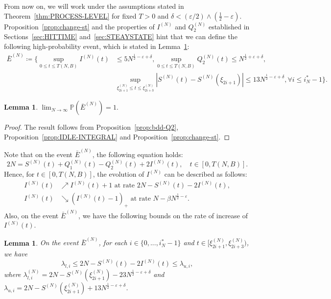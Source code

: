 \documentclass[11pt, reqno]{article}
\newtheorem{lemma}[theorem]{Lemma}
\numberwithin{equation}{section}
\numberwithin{theorem}{section}
\begin{document}
From now on, we will work under the assumptions stated in Theorem~\ref{thm:PROCESS-LEVEL} for fixed $T>0$ and $\delta<(\varepsilon/2) \wedge \left(\frac{1}{2} - \varepsilon\right)$. 
Proposition~\ref{prop:change-st} and the properties of $I^{(N)}$ and $Q_2^{(N)}$ established in Sections~\ref{sec:HITTIME} and~\ref{sec:STEAYSTATE} hint that we can define the following high-probability event, which is stated in Lemma~\ref{lem:EN-to-1}:
\begin{equation}
\begin{split}
    \bar{E}^{(N)}\coloneqq\Big\{\sup_{0\leq t\leq T(N,B)}I^{(N)}(t)&\leq 5N^{\frac{1}{2}-\varepsilon+\delta},\sup_{0\leq t\leq T(N,B)}Q^{(N)}_2(t)\leq  N^{\frac{1}{2}+\varepsilon+\delta},\\
    &\sup_{\xi^{(N)}_{2i+1}\leq t\leq \xi^{(N)}_{2i+3}}\left|S^{(N)}(t)-S^{(N)}(\xi_{2i+1})\right|\leq 13 N^{\frac{1}{2}-\varepsilon+\delta},\forall i\leq i^*_N-1\Big\}.
\end{split}
\end{equation}
\begin{lemma}\label{lem:EN-to-1}
$\lim_{N\rightarrow\infty}\mathbb{P}(\bar{E}^{(N)})=1.$
\end{lemma}
\begin{proof}
The result follows from Proposition~\ref{prop:bdd-Q2}, Proposition~\ref{prop:IDLE-INTEGRAL} and Proposition~\ref{prop:change-st}.
\end{proof}
Note that on the event $\bar{E}^{(N)}$, the following equation holds:
\begin{equation}
    2N=S^{(N)}(t)+Q_1^{(N)}(t)-Q_2^{(N)}(t)+2I^{(N)}(t),\quad t\in [0,T(N,B)].
\end{equation}
Hence, for $t\in[0,T(N,B)]$, the evolution of $I^{(N)}$ can be described as follows:
\begin{align*}
    I^{(N)}(t)&\nearrow I^{(N)}(t)+1\text{  at rate  }2N-S^{(N)}(t)- 2I^{(N)}(t),\\
    I^{(N)}(t)&\searrow (I^{(N)}(t)-1)_+\text{  at rate  }N-\beta N^{\frac{1}{2}-\varepsilon}.
\end{align*}
Also, on the event $\bar{E}^{(N)}$, we have the following bounds on the rate of increase of $I^{(N)}(t)$.
\begin{lemma}\label{lem:u-l-bund}
On the event $\bar{E}^{(N)}$, for each $i\in\{0,...,i^*_N-1\}$ and $t\in[\xi^{(N)}_{2i+1},\xi^{(N)}_{2i+3})$, we have \begin{equation*}
    \lambda_{l,i}\leq 2N-S^{(N)}(t)-2 I^{(N)}(t)\leq \lambda_{u,i},
\end{equation*}
where $\lambda^{(N)}_{l,i}=2N-S^{(N)}(\xi^{(N)}_{2i+1})- 23 N^{\frac{1}{2}-\varepsilon+\delta}$ and $\lambda_{u,i}=2N-S^{(N)}(\xi^{(N)}_{2i+1})+ 13 N^{\frac{1}{2}-\varepsilon+\delta}$.
\end{lemma}
\end{document}
